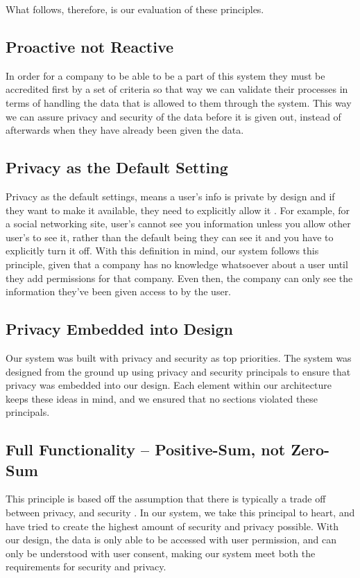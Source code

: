 \documentclass[11pt,journal]{IEEEtran}
\begin{document}
What follows, therefore, is our evaluation of these principles.

\subsection{Proactive not Reactive}
In order for a company to be able to be a part of this system they must be accredited first by a set of criteria so that way we can validate their processes in terms of handling the data that is allowed to them through the system. This way we can assure privacy and security of the data before it is given out, instead of afterwards when they have already been given the data.


\subsection{Privacy as the Default Setting}
Privacy as the default settings, means a user’s info is private by design and if they want to make it available, they need to explicitly allow it \cite{cavoukian2010privacy}. For example, for a social networking site, user’s cannot see you information unless you allow other user’s to see it, rather than the default being they can see it and you have to explicitly turn it off. With this definition in mind, our system follows this principle, given that a company has no knowledge whatsoever about a user until they add permissions for that company. Even then, the company can only see the information they’ve been given access to by the user. 

\subsection{Privacy Embedded into Design}
Our system was built with privacy and security as top priorities. The system was designed from the ground up using privacy and security principals to ensure that privacy was embedded into our design. Each element within our architecture keeps these ideas in mind, and we ensured that no sections violated these principals.


\subsection{Full Functionality -- Positive-Sum, not Zero-Sum}
This principle is based off the assumption that there is typically a trade off between privacy, and security \cite{cavoukian2010privacy}. In our system, we take this principal to heart, and have tried to create the highest amount of security and privacy possible. With our design, the data is only able to be accessed with user permission, and can only be understood with user consent, making our system meet both the requirements for security and privacy.
\end{document}
